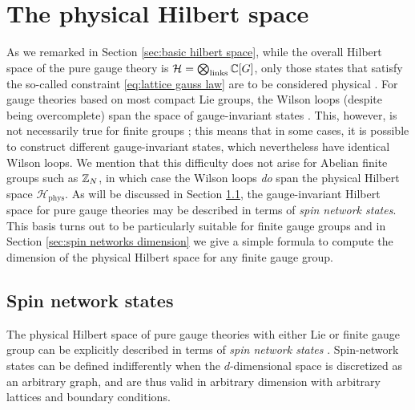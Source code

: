 \section{The physical Hilbert space}\label{sec:physical Hilbert space}

As we remarked in Section \ref{sec:basic hilbert space}, while the overall Hilbert space of the pure gauge theory is $\mathcal{H} = \bigotimes_{\mathrm{links}} \mathbb{C}[G]$, only those states that satisfy the so-called  constraint \eqref{eq:lattice gauss law} are to be considered physical \cite{kogut1975hamiltonian, milstead2018qyangmills, tong2018gauge}.
For gauge theories based on most compact Lie groups, the Wilson loops (despite being overcomplete) span the space of gauge-invariant states \cite{sengupta1994gaugeinvariant, durhuus1980gaugeinvariant}.
This, however, is not necessarily true for finite groups \cite{sengupta1994gaugeinvariant, cui2020kitaev}; this means that in some cases, it is possible to construct different gauge-invariant states, which nevertheless have identical Wilson loops.
We mention that this difficulty does not arise for Abelian finite groups such as $\mathbb{Z}_N$, in which case the Wilson loops \textit{do} span the physical Hilbert space $\mathcal{H}_{\mathrm{phys}}$.
As will be discussed in Section \ref{sec:spin networks pure gauge}, the gauge-invariant Hilbert space for pure gauge theories may be described in terms of \textit{spin network states}. This basis turns out to be particularly suitable for finite gauge groups and in Section \ref{sec:spin networks dimension} we give a simple formula to compute the dimension of the physical Hilbert space for any finite gauge group.

\subsection{Spin network states}\label{sec:spin networks pure gauge}

The physical Hilbert space of pure gauge theories with either Lie or finite gauge group can be explicitly described in terms of \textit{spin network states} \cite{baez1996spinnetworks, burgio2000physical}.
Spin-network states can be defined indifferently when the $d$-dimensional space is discretized as an arbitrary graph, and are thus valid in arbitrary dimension with arbitrary lattices and boundary conditions.

\medskip


